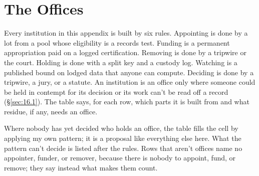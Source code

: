 \chapter{The Offices}
\label{sec:C}

Every institution in this appendix is built by six rules. Appointing is done by a lot from a pool whose eligibility is a records test. Funding is a permanent appropriation paid on a logged certification. Removing is done by a tripwire or the court. Holding is done with a split key and a custody log. Watching is a published bound on lodged data that anyone can compute. Deciding is done by a tripwire, a jury, or a statute. An institution is an office only where someone could be held in contempt for its decision or its work can't be read off a record (\S\ref{sec:16.1}). The table says, for each row, which parts it is built from and what residue, if any, needs an office.


Where nobody has yet decided who holds an office, the table fills the cell by applying my own pattern; it is a proposal like everything else here. What the pattern can't decide is listed after the rules. Rows that aren't offices name no appointer, funder, or remover, because there is nobody to appoint, fund, or remove; they say instead what makes them count.

